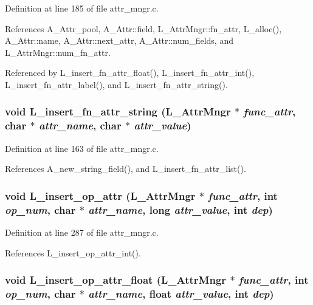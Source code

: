 Definition at line 185 of file attr\_\-mngr.c.

References A\_\-Attr\_\-pool, A\_\-Attr::field, L\_\-Attr\-Mngr::fn\_\-attr, L\_\-alloc(), A\_\-Attr::name, A\_\-Attr::next\_\-attr, A\_\-Attr::num\_\-fields, and L\_\-Attr\-Mngr::num\_\-fn\_\-attr.

Referenced by L\_\-insert\_\-fn\_\-attr\_\-float(), L\_\-insert\_\-fn\_\-attr\_\-int(), L\_\-insert\_\-fn\_\-attr\_\-label(), and L\_\-insert\_\-fn\_\-attr\_\-string().
\subsubsection{\setlength{\rightskip}{0pt plus 5cm}void L\_\-insert\_\-fn\_\-attr\_\-string (\bf{L\_\-Attr\-Mngr} $\ast$ {\em func\_\-attr}, char $\ast$ {\em attr\_\-name}, char $\ast$ {\em attr\_\-value})}\label{attr__mngr_8c_205db31c2aaf8c8e935269742706f301}




Definition at line 163 of file attr\_\-mngr.c.

References A\_\-new\_\-string\_\-field(), and L\_\-insert\_\-fn\_\-attr\_\-list().
\subsubsection{\setlength{\rightskip}{0pt plus 5cm}void L\_\-insert\_\-op\_\-attr (\bf{L\_\-Attr\-Mngr} $\ast$ {\em func\_\-attr}, int {\em op\_\-num}, char $\ast$ {\em attr\_\-name}, long {\em attr\_\-value}, int {\em dep})}\label{attr__mngr_8c_68aa3ecdd17e441baab84bba0b675782}




Definition at line 287 of file attr\_\-mngr.c.

References L\_\-insert\_\-op\_\-attr\_\-int().
\subsubsection{\setlength{\rightskip}{0pt plus 5cm}void L\_\-insert\_\-op\_\-attr\_\-float (\bf{L\_\-Attr\-Mngr} $\ast$ {\em func\_\-attr}, int {\em op\_\-num}, char $\ast$ {\em attr\_\-name}, float {\em attr\_\-value}, int {\em dep})}\label{attr__mngr_8c_806c6ea4c63be25bb18917d9b7f0e458}




